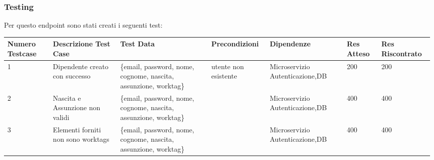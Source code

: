 \documentclass{report}
\begin{document}
\subsubsection*{Testing}
Per questo endpoint sono stati creati i seguenti test:
\begin{center} %
	\centering
	\begin{tabular}{ |p{1cm}|p{2cm}|p{2cm}|p{2cm}|p{2cm}|p{1cm}|p{1cm}| }
		\hline
		Numero Testcase & Descrizione Test Case & Test Data                   & Precondizioni                                          & Dipendenze & Res Atteso & Res Riscontrato \\
		\hline
		1               & Dipendente creato con successo    & \{email, password, nome, cognome, nascita, assunzione, worktag\}  & utente non esistente &  Microservizio Autenticazione,DB         & 200        & 200             \\
		\hline
		2               & Nascita e Assunzione non validi    & \{email, password, nome, cognome, nascita, assunzione, worktag\}  &  &  Microservizio Autenticazione,DB         & 400        & 400           \\
		\hline
		3              & Elementi forniti non sono worktags    & \{email, password, nome, cognome, nascita, assunzione, worktag\}  &  &  Microservizio Autenticazione,DB         & 400        & 400           \\
		\hline
	\end{tabular}
\end{center}
\end{document}
